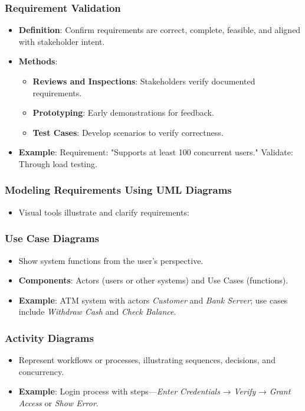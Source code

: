 \documentclass{beamer}
\begin{document}
\begin{frame}[fragile]
    \frametitle{Requirement Validation}
    \begin{itemize}
        \item \textbf{Definition}: Confirm requirements are correct, complete, feasible, and aligned with stakeholder intent.
        \item \textbf{Methods}:
        \begin{itemize}
            \item \textbf{Reviews and Inspections}: Stakeholders verify documented requirements.
            \item \textbf{Prototyping}: Early demonstrations for feedback.
            \item \textbf{Test Cases}: Develop scenarios to verify correctness.
        \end{itemize}
        \item \textbf{Example}:  
        \newline
        Requirement: "Supports at least 100 concurrent users."  
        \newline
        Validate: Through load testing.
    \end{itemize}
\end{frame}

\begin{frame}[fragile]
    \frametitle{Modeling Requirements Using UML Diagrams}
    \begin{itemize}
        \item Visual tools illustrate and clarify requirements:
    \end{itemize}
\end{frame}

\begin{frame}[fragile]
    \frametitle{Use Case Diagrams}
    \begin{itemize}
        \item Show system functions from the user’s perspective.
        \item \textbf{Components}: Actors (users or other systems) and Use Cases (functions).
        \item \textbf{Example}: ATM system with actors \textit{Customer} and \textit{Bank Server}; use cases include \textit{Withdraw Cash} and \textit{Check Balance}.
    \end{itemize}
\end{frame}

\begin{frame}[fragile]
    \frametitle{Activity Diagrams}
    \begin{itemize}
        \item Represent workflows or processes, illustrating sequences, decisions, and concurrency.
        \item \textbf{Example}: Login process with steps—\textit{Enter Credentials} → \textit{Verify} → \textit{Grant Access} or \textit{Show Error}.
    \end{itemize}
\end{frame}
\end{document}
